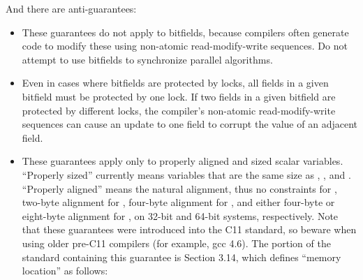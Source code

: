 And there are anti-guarantees:

\begin{itemize}
 \item These guarantees do not apply to bitfields, because compilers often
       generate code to modify these using non-atomic read-modify-write
       sequences.
       Do not attempt to use bitfields to synchronize parallel algorithms.

 \item Even in cases where bitfields are protected by locks, all fields
       in a given bitfield must be protected by one lock.
       If two fields in a given bitfield are protected by different locks,
       the compiler's non-atomic read-modify-write sequences can cause
       an update to one field to corrupt the value of an adjacent field.

 \item These guarantees apply only to properly aligned and sized scalar
       variables.
       ``Properly sized'' currently means variables that are the same size
       as , ,  and .
       ``Properly aligned'' means the natural alignment, thus no
       constraints for , two-byte alignment for ,
       four-byte alignment for , and either four-byte or eight-byte
       alignment for , on 32-bit and 64-bit systems, respectively.
       Note that these guarantees were introduced into the C11 standard,
       so beware when using older pre-C11 compilers (for example, gcc 4.6).
       The portion of the standard containing this guarantee is
       Section 3.14, which defines ``memory location'' as follows:

\end{itemize}

